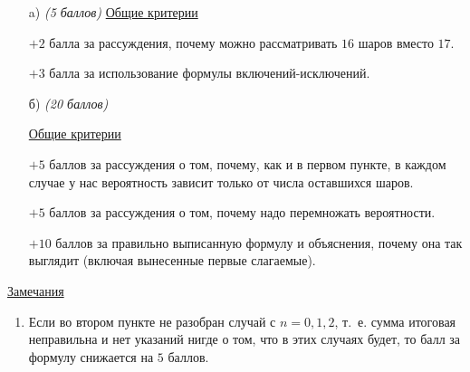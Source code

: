 \begin{enumerate}
	\item[a)] \textit{(5 баллов)}
		\underline{Общие критерии}

		$+2$ балла за рассуждения, почему можно рассматривать $16$ шаров
		вместо $17$.
	
		$+3$ балла за использование формулы включений-исключений.
	
	\item[б)] \textit{(20 баллов)}

		\underline{Общие критерии}

		$+5$ баллов за рассуждения о том, почему, как и в первом
		пункте, в каждом случае у нас вероятность зависит только от
		числа оставшихся шаров.
	
		$+5$ баллов за рассуждения о том, почему надо 
		перемножать вероятности.

		$+10$ баллов за правильно выписанную формулу и объяснения,
		почему она так выглядит (включая вынесенные первые слагаемые).
\end{enumerate}	

	\underline{Замечания} 
\begin{enumerate}
	\item Если во втором пункте не разобран случай с $n = 0, 1, 2$,
	т.~е. сумма итоговая неправильна и нет указаний нигде о том,
	что в этих случаях будет, то балл за формулу снижается на $5$ баллов.
\end{enumerate}
